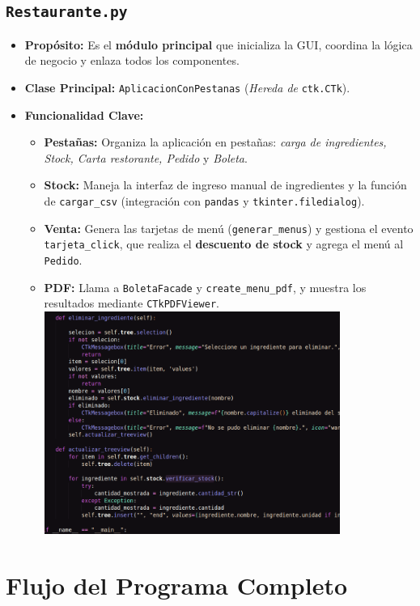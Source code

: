 \documentclass[a4paper, 12pt]{article}
\begin{document}
\subsection{\texttt{Restaurante.py}}
\begin{itemize}
    \item \textbf{Propósito:} Es el \textbf{módulo principal} que inicializa la GUI, coordina la lógica de negocio y enlaza todos los componentes.
    \item \textbf{Clase Principal:} \texttt{AplicacionConPestanas} (\textit{Hereda de} \texttt{ctk.CTk}).
    \item \textbf{Funcionalidad Clave:}
    \begin{itemize}
        \item \textbf{Pestañas:} Organiza la aplicación en pestañas: \textit{carga de ingredientes, Stock, Carta restorante, Pedido} y \textit{Boleta}.
        \item \textbf{Stock:} Maneja la interfaz de ingreso manual de ingredientes y la función de \texttt{cargar\_csv} (integración con \texttt{pandas} y \texttt{tkinter.filedialog}).
        \item \textbf{Venta:} Genera las tarjetas de menú (\texttt{generar\_menus}) y gestiona el evento \texttt{tarjeta\_click}, que realiza el \textbf{descuento de stock} y agrega el menú al \texttt{Pedido}.
        \item \textbf{PDF:} Llama a \texttt{BoletaFacade} y \texttt{create\_menu\_pdf}, y muestra los resultados mediante \texttt{CTkPDFViewer}.\\
\includegraphics[width=0.8\textwidth]{images/12.png}
    \end{itemize}
\end{itemize}
\newpage
\section{Flujo del Programa Completo}
\end{document}
